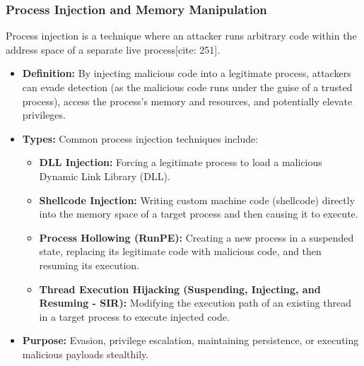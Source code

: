 \documentclass[11pt]{article}
\begin{document}
	\subsubsection{Process Injection and Memory Manipulation}
	Process injection is a technique where an attacker runs arbitrary code within the address space of a separate live process[cite: 251].
	\begin{itemize}
		\item \textbf{Definition:} By injecting malicious code into a legitimate process, attackers can evade detection (as the malicious code runs under the guise of a trusted process), access the process's memory and resources, and potentially elevate privileges.
		\item \textbf{Types:} Common process injection techniques include:
		\begin{itemize}
			\item \textbf{DLL Injection:} Forcing a legitimate process to load a malicious Dynamic Link Library (DLL).
			\item \textbf{Shellcode Injection:} Writing custom machine code (shellcode) directly into the memory space of a target process and then causing it to execute.
			\item \textbf{Process Hollowing (RunPE):} Creating a new process in a suspended state, replacing its legitimate code with malicious code, and then resuming its execution.
			\item \textbf{Thread Execution Hijacking (Suspending, Injecting, and Resuming - SIR):} Modifying the execution path of an existing thread in a target process to execute injected code.
		\end{itemize}
		\item \textbf{Purpose:} Evasion, privilege escalation, maintaining persistence, or executing malicious payloads stealthily.
	\end{itemize}
	
\end{document}
